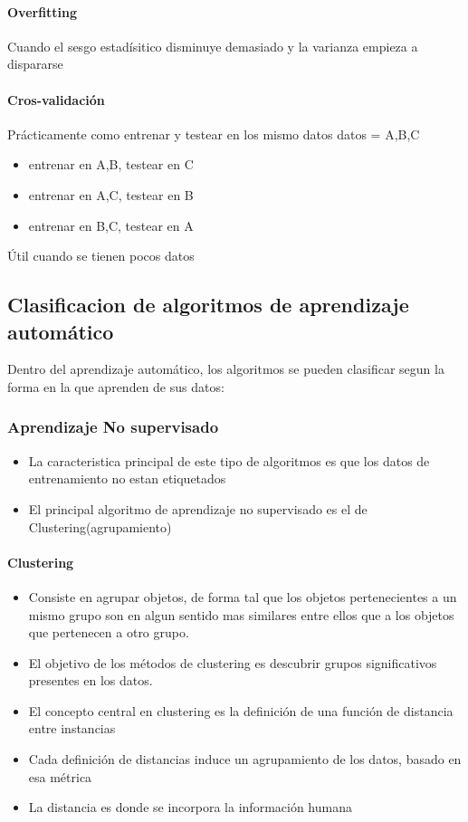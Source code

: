 \documentclass[a4paper,10pt]{article}
\begin{document}
	\paragraph {Overfitting}
	  Cuando el sesgo estadísitico disminuye demasiado y la varianza empieza a dispararse

	\paragraph {Cros-validación}
	  Prácticamente como entrenar y testear en los mismo datos
	  datos = {A,B,C}
	  \begin{itemize}
	    \item entrenar en A,B, testear en C
	    \item entrenar en A,C, testear en B
	    \item entrenar en B,C, testear en A
	  \end{itemize}
	  Útil cuando se tienen pocos datos

  \subsection{Clasificacion de algoritmos de aprendizaje automático}
    Dentro del aprendizaje automático, los algoritmos se pueden clasificar segun la forma en la que aprenden de sus datos:

    \subsubsection{Aprendizaje No supervisado} 
      \begin{itemize}
	\item La caracteristica principal de este tipo de algoritmos es que los datos de entrenamiento no estan etiquetados
	\item El principal algoritmo de aprendizaje no supervisado es el de Clustering(agrupamiento)
      \end{itemize}
      \paragraph {Clustering}
	\begin{itemize}
	  \item Consiste en agrupar objetos, de forma tal que los objetos pertenecientes a un mismo grupo son en algun sentido mas similares entre ellos que a los objetos que pertenecen a otro grupo.
	  \item El objetivo de los métodos de clustering es descubrir grupos significativos presentes en los datos.
	  \item El concepto central en clustering es la definición de una función de distancia entre instancias
	  \item Cada definición de distancias induce un agrupamiento de los datos, basado en esa métrica
	  \item La distancia es donde se incorpora la información humana
	\end{itemize}
\end{document}

